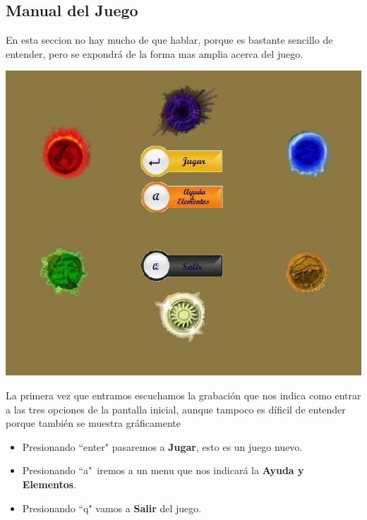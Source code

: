 \documentclass[10pt]{article}
\begin{document}
{\begin{flushleft}
\subsection{Manual del Juego}
En esta seccion no hay mucho de que hablar, porque es bastante sencillo de entender, pero se expondr\'a de la forma mas amplia acerca del juego.\\
\begin{center}
\includegraphics[scale=0.7]{newMain}
\end{center}
La primera vez que entramos escuchamos la grabaci\'on que nos indica como entrar a las tres opciones de la pantalla inicial, aunque tampoco es d\'ificil de entender porque tambi\'en se muestra gr\'aficamente
\vspace{0.3in}
\begin{itemize}
\item{}Presionando ``enter" pasaremos a \textbf{Jugar}, esto es un juego nuevo.
\item{}Presionando ``a"\ iremos a un menu que nos indicar\'a la \textbf{Ayuda y Elementos}.
\item{}Presionando ``q" vamos a \textbf{Salir} del juego.
\end{itemize}

\newpage

\end{flushleft}}
\end{document}
